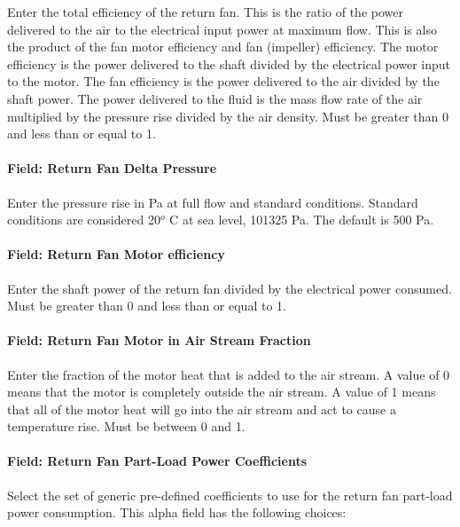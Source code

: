 Enter the total efficiency of the return fan. This is the ratio of the power delivered to the air to the electrical input power at maximum flow. This is also the product of the fan motor efficiency and fan (impeller) efficiency. The motor efficiency is the power delivered to the shaft divided by the electrical power input to the motor. The fan efficiency is the power delivered to the air divided by the shaft power. The power delivered to the fluid is the mass flow rate of the air multiplied by the pressure rise divided by the air density. Must be greater than 0 and less than or equal to 1.

\paragraph{Field: Return Fan Delta Pressure}\label{field-return-fan-delta-pressure-3}

Enter the pressure rise in Pa at full flow and standard conditions. Standard conditions are considered 20\(^{o}\) C at sea level, 101325 Pa. The default is 500 Pa.

\paragraph{Field: Return Fan Motor efficiency}\label{field-return-fan-motor-efficiency-3}

Enter the shaft power of the return fan divided by the electrical power consumed. Must be greater than 0 and less than or equal to 1.

\paragraph{Field: Return Fan Motor in Air Stream Fraction}\label{field-return-fan-motor-in-air-stream-fraction-3}

Enter the fraction of the motor heat that is added to the air stream. A value of 0 means that the motor is completely outside the air stream. A value of 1 means that all of the motor heat will go into the air stream and act to cause a temperature rise. Must be between 0 and 1.

\paragraph{Field: Return Fan Part-Load Power Coefficients}\label{field-return-fan-part-load-power-coefficients}

Select the set of generic pre-defined coefficients to use for the return fan part-load power consumption. This alpha field has the following choices:

